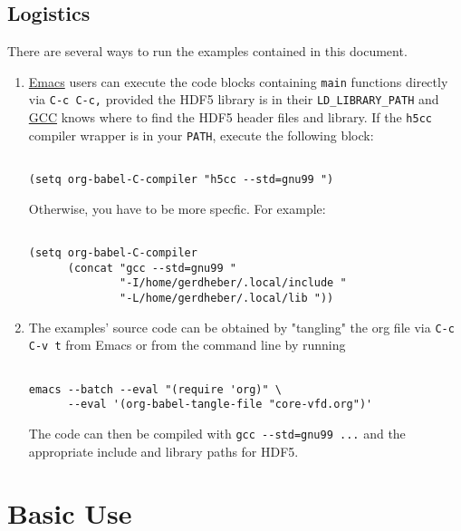 \documentclass[a4paper, 12pt]{article}
\begin{document}
\subsection{Logistics}
\label{sec:orge4caebf}

There are several ways to run the examples contained in this document.

\begin{enumerate}
\item \href{https://www.gnu.org/software/emacs/}{Emacs} users can execute the code blocks containing \texttt{main} functions
directly via \texttt{C-c C-c,} provided the HDF5 library is in their
\texttt{LD\_LIBRARY\_PATH} and \href{https://gcc.gnu.org/}{GCC} knows where to find the HDF5 header files and
library. If the \texttt{h5cc} compiler wrapper is in your \texttt{PATH}, execute the
following block:

\begin{verbatim}

(setq org-babel-C-compiler "h5cc --std=gnu99 ")

\end{verbatim}

Otherwise, you have to be more specfic. For example:

\begin{verbatim}

(setq org-babel-C-compiler
      (concat "gcc --std=gnu99 "
              "-I/home/gerdheber/.local/include "
              "-L/home/gerdheber/.local/lib "))

\end{verbatim}

\item The examples' source code can be obtained by "tangling" the org file via
\texttt{C-c C-v t} from Emacs or from the command line by running

\begin{verbatim}

emacs --batch --eval "(require 'org)" \
      --eval '(org-babel-tangle-file "core-vfd.org")'

\end{verbatim}

The code can then be compiled with \texttt{gcc -{}-std=gnu99 ...} and the
appropriate include and library paths for HDF5.
\end{enumerate}

\section{Basic Use  \label{orged3315b}}
\label{sec:orga642e79}
\end{document}
